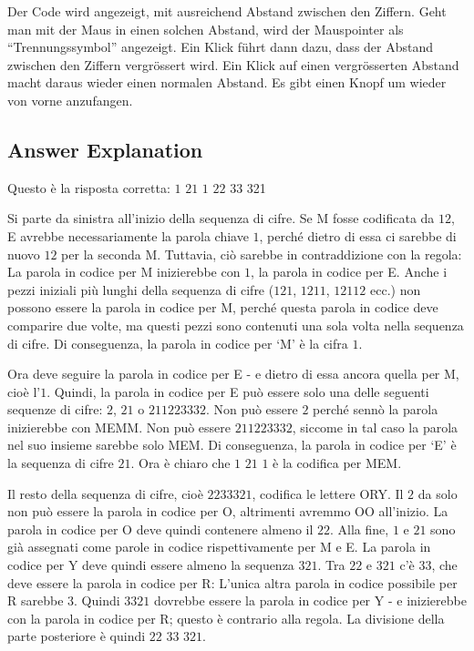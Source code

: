 \documentclass[a4paper,11pt]{report}
\newcommand{\BrochureInlineCode}[1]{{\ttfamily #1}}
\begin{document}
Der Code wird angezeigt, mit ausreichend Abstand zwischen den Ziffern.  Geht man mit der Maus in einen solchen Abstand, wird der Mauspointer als \enquote{Trennungssymbol} angezeigt.  Ein Klick führt dann dazu, dass der Abstand zwischen den Ziffern vergrössert wird.  Ein Klick auf einen vergrösserten Abstand macht daraus wieder einen normalen Abstand. Es gibt einen Knopf um wieder von vorne anzufangen.

\endgroup

\subsection*{Answer Explanation}

Questo è la risposta corretta: $1$ $21$ $1$ $22$ $33$ 321

Si parte da sinistra all’inizio della sequenza di cifre. Se \BrochureInlineCode{M} fosse codificata da $12$, \BrochureInlineCode{E} avrebbe necessariamente la parola chiave $1$, perché dietro di essa ci sarebbe di nuovo $12$ per la seconda \BrochureInlineCode{M}. Tuttavia, ciò sarebbe in contraddizione con la regola: La parola in codice per \BrochureInlineCode{M} inizierebbe con $1$, la parola in codice per E. Anche i pezzi iniziali più lunghi della sequenza di cifre ($121$, $1211$, $12112$ ecc.) non possono essere la parola in codice per \BrochureInlineCode{M}, perché questa parola in codice deve comparire due volte, ma questi pezzi sono contenuti una sola volta nella sequenza di cifre. Di conseguenza, la parola in codice per `M’ è la cifra $1$.

Ora deve seguire la parola in codice per \BrochureInlineCode{E} - e dietro di essa ancora quella per M, cioè l’$1$. Quindi, la parola in codice per \BrochureInlineCode{E} può essere solo una delle seguenti sequenze di cifre: $2$, $21$ o $211223332$. Non può essere $2$ perché sennò la parola inizierebbe con MEMM. Non può essere $211223332$, siccome in tal caso la parola nel suo insieme sarebbe solo MEM. Di conseguenza, la parola in codice per `E’ è la sequenza di cifre $21$. Ora è chiaro che $1$ $21$ $1$ è la codifica per MEM.

Il resto della sequenza di cifre, cioè $2233321$, codifica le lettere ORY. Il $2$ da solo non può essere la parola in codice per \BrochureInlineCode{O}, altrimenti avremmo \BrochureInlineCode{OO} all’inizio. La parola in codice per \BrochureInlineCode{O} deve quindi contenere almeno il $22$. Alla fine, $1$ e $21$ sono già assegnati come parole in codice rispettivamente per \BrochureInlineCode{M} e \BrochureInlineCode{E}. La parola in codice per \BrochureInlineCode{Y} deve quindi essere almeno la sequenza $321$. Tra $22$ e $321$ c’è $33$, che deve essere la parola in codice per \BrochureInlineCode{R}: L’unica altra parola in codice possibile per \BrochureInlineCode{R} sarebbe $3$. Quindi $3321$ dovrebbe essere la parola in codice per \BrochureInlineCode{Y} - e inizierebbe con la parola in codice per \BrochureInlineCode{R}; questo è contrario alla regola. La divisione della parte posteriore è quindi $22$ $33$ $321$.
\end{document}
